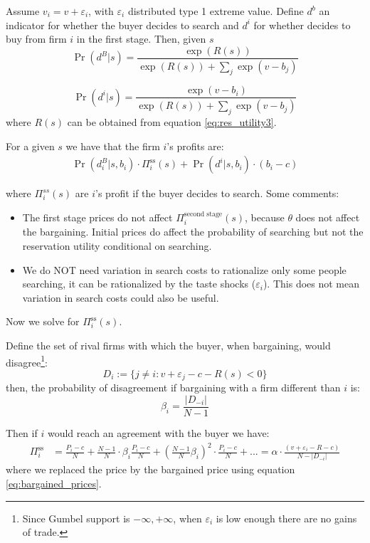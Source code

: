 \documentclass[12pt]{article}
\theoremstyle{plain}
\theoremstyle{plain}
\begin{document}


Assume $v_i = v + \varepsilon_i $, with $\varepsilon_i$ distributed type 1 extreme value. Define $d^b$ an indicator for whether the buyer decides to search and $d^i$ for whether decides to buy from firm $i$ in the first stage. Then, given $s$ 
\[
\Pr(d^B|s) = \frac{\exp(R(s))}{\exp(R(s)) + \sum_j \exp(v - b_j)}
\]


\[
\Pr(d^i|s) = \frac{\exp(v - b_i)}{\exp(R(s)) + \sum_j \exp(v - b_j)}
\]
where  $R(s)$ can be obtained from  equation \ref{eq:res_utility3}.


For a given $s$ we have that the firm $i$'s profits are: 
\begin{align}\label{eq:profits}
    \Pr(d^B_i|s,b_i) \cdot     \Pi^{\text{ss}}_i(s) + \Pr(d^i|s, b_i) \cdot (b_i - c)    
\end{align}

where $\Pi^{ss}_i(s)$ are $i$'s profit if the buyer decides to search.
Some comments: 
\begin{itemize}
    \item The first stage prices do not affect $\Pi^{\text{second stage}}_i(s)$, because $\theta$ does not affect the bargaining. Initial prices do affect the probability of searching but not the reservation utility conditional on searching.  
    \item We do NOT need variation in search costs to rationalize only some people searching, it can be rationalized by the taste shocks ($\varepsilon_i$). This does not mean variation in search costs could also be useful. 
\end{itemize}

Now we solve for $\Pi^{\text{ss}}_i(s)$. 

Define the set of rival firms with which the buyer, when bargaining, would disagree\footnote{Since Gumbel support is \( -\infty, +\infty \), when \( \varepsilon_i \) is low enough there are no gains of trade.}: 
\[
D_i := \{j \neq i : v + \varepsilon_j - c - R(s) < 0\}
\]
then, the probability of disagreement if bargaining with a firm different than $i$ is: 
$$
\beta_i = \frac{|D_{-i}|}{N - 1} 
$$



Then if $i$ would reach an agreement with the buyer we have: 
\begin{align*}
\Pi^{\text{ss}}_i &= \frac{P_i - c}{N} 
+ \frac{N - 1}{N} \cdot \beta_i \frac{P_i - c}{N} 
+ \left( \frac{N - 1}{N} \beta_i \right)^2 \cdot \frac{P_i - c}{N} + ... 
 = \alpha \cdot \frac{(v + \varepsilon_i - R - c)}{N - |D_{-i}|}
\end{align*}
where we replaced the price by the bargained price using equation \ref{eq:bargained_prices}. 
\end{document}
